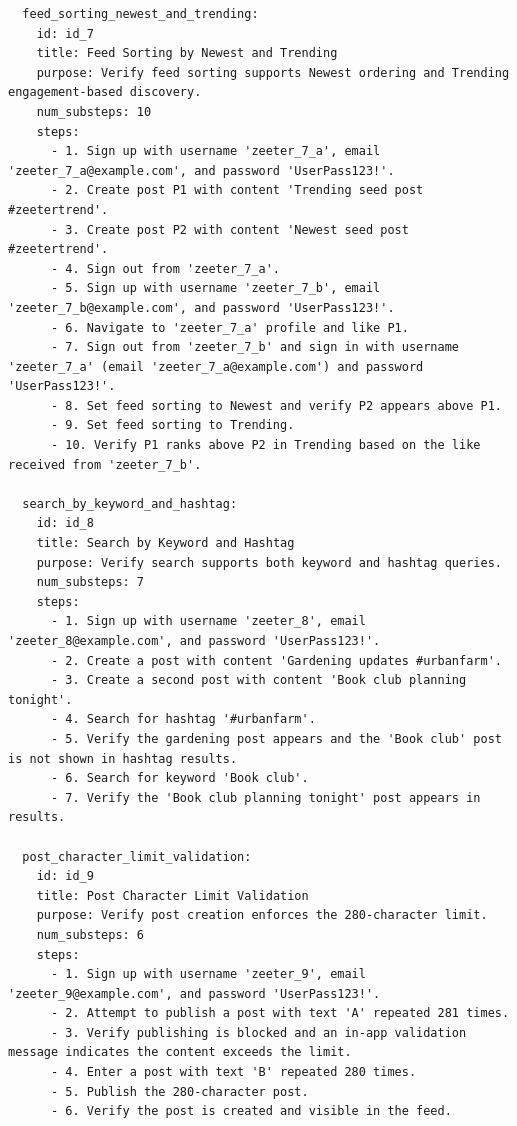 \begin{lstlisting}
  feed_sorting_newest_and_trending:
    id: id_7
    title: Feed Sorting by Newest and Trending
    purpose: Verify feed sorting supports Newest ordering and Trending engagement-based discovery.
    num_substeps: 10
    steps:
      - 1. Sign up with username 'zeeter_7_a', email 'zeeter_7_a@example.com', and password 'UserPass123!'.
      - 2. Create post P1 with content 'Trending seed post #zeetertrend'.
      - 3. Create post P2 with content 'Newest seed post #zeetertrend'.
      - 4. Sign out from 'zeeter_7_a'.
      - 5. Sign up with username 'zeeter_7_b', email 'zeeter_7_b@example.com', and password 'UserPass123!'.
      - 6. Navigate to 'zeeter_7_a' profile and like P1.
      - 7. Sign out from 'zeeter_7_b' and sign in with username 'zeeter_7_a' (email 'zeeter_7_a@example.com') and password 'UserPass123!'.
      - 8. Set feed sorting to Newest and verify P2 appears above P1.
      - 9. Set feed sorting to Trending.
      - 10. Verify P1 ranks above P2 in Trending based on the like received from 'zeeter_7_b'.

  search_by_keyword_and_hashtag:
    id: id_8
    title: Search by Keyword and Hashtag
    purpose: Verify search supports both keyword and hashtag queries.
    num_substeps: 7
    steps:
      - 1. Sign up with username 'zeeter_8', email 'zeeter_8@example.com', and password 'UserPass123!'.
      - 2. Create a post with content 'Gardening updates #urbanfarm'.
      - 3. Create a second post with content 'Book club planning tonight'.
      - 4. Search for hashtag '#urbanfarm'.
      - 5. Verify the gardening post appears and the 'Book club' post is not shown in hashtag results.
      - 6. Search for keyword 'Book club'.
      - 7. Verify the 'Book club planning tonight' post appears in results.

  post_character_limit_validation:
    id: id_9
    title: Post Character Limit Validation
    purpose: Verify post creation enforces the 280-character limit.
    num_substeps: 6
    steps:
      - 1. Sign up with username 'zeeter_9', email 'zeeter_9@example.com', and password 'UserPass123!'.
      - 2. Attempt to publish a post with text 'A' repeated 281 times.
      - 3. Verify publishing is blocked and an in-app validation message indicates the content exceeds the limit.
      - 4. Enter a post with text 'B' repeated 280 times.
      - 5. Publish the 280-character post.
      - 6. Verify the post is created and visible in the feed.

\end{lstlisting}

